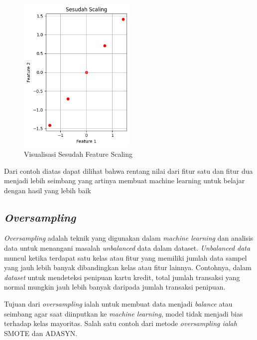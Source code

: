 \begin{figure}[H] %
    \centering
    \includegraphics[width=0.5\textwidth]{figure/after feature scaling.png}
    \caption{Visualisasi Sesudah Feature Scaling}
    \label{fig:2.visualisasisesudahfeaturescaling}
\end{figure}
Dari contoh diatas dapat dilihat bahwa rentang nilai dari fitur satu dan fitur dua menjadi lebih seimbang yang artinya membuat machine learning untuk belajar dengan hasil yang lebih baik

\subsection{\textit{Oversampling}} \label{II.oversampling}
\textit{Oversampling} adalah teknik yang digunakan dalam \textit{machine learning} dan analisis data untuk menangani masalah \textit{unbalanced} data dalam dataset\cite{liu2004effect}. \textit{Unbalanced data} muncul ketika terdapat satu kelas atau fitur yang memiliki jumlah data sampel yang jauh lebih banyak dibandingkan kelas atau fitur lainnya\cite{dal2015calibrating}. Contohnya, dalam \textit{dataset} untuk mendeteksi penipuan kartu kredit, total jumlah transaksi yang normal mungkin jauh lebih banyak daripada jumlah transaksi penipuan.

Tujuan dari \textit{oversampling} ialah untuk membuat data menjadi \textit{balance} atau seimbang agar saat diinputkan ke \textit{machine learning}, model tidak menjadi bias terhadap kelas mayoritas. Salah satu contoh dari metode \textit{oversampling ialah} SMOTE\cite{chawla2002smote} dan ADASYN\cite{4633969}.   

